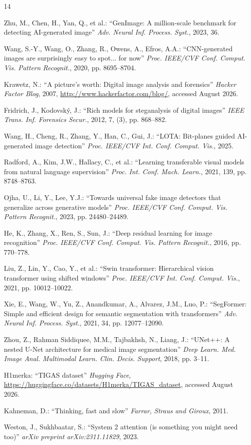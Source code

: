 \documentclass[11pt]{ctexart}
\begin{document}
\begin{thebibliography}{14}

 Zhu, M., Chen, H., Yan, Q., et al.: ``GenImage: A million-scale benchmark for detecting AI-generated image'' \textit{Adv. Neural Inf. Process. Syst.}, 2023, 36.

 Wang, S.-Y., Wang, O., Zhang, R., Owens, A., Efros, A.A.: ``CNN-generated images are surprisingly easy to spot... for now'' \textit{Proc. IEEE/CVF Conf. Comput. Vis. Pattern Recognit.}, 2020, pp. 8695--8704.

 Krawetz, N.: ``A picture's worth: Digital image analysis and forensics'' \textit{Hacker Factor Blog}, 2007, \url{http://www.hackerfactor.com/blog/}, accessed August 2026.

 Fridrich, J., Kodovsk\'{y}, J.: ``Rich models for steganalysis of digital images'' \textit{IEEE Trans. Inf. Forensics Secur.}, 2012, 7, (3), pp. 868--882.

 Wang, H., Cheng, R., Zhang, Y., Han, C., Gui, J.: ``LOTA: Bit-planes guided AI-generated image detection'' \textit{Proc. IEEE/CVF Int. Conf. Comput. Vis.}, 2025.

 Radford, A., Kim, J.W., Hallacy, C., et al.: ``Learning transferable visual models from natural language supervision'' \textit{Proc. Int. Conf. Mach. Learn.}, 2021, 139, pp. 8748--8763.

 Ojha, U., Li, Y., Lee, Y.J.: ``Towards universal fake image detectors that generalize across generative models'' \textit{Proc. IEEE/CVF Conf. Comput. Vis. Pattern Recognit.}, 2023, pp. 24480--24489.

 He, K., Zhang, X., Ren, S., Sun, J.: ``Deep residual learning for image recognition'' \textit{Proc. IEEE/CVF Conf. Comput. Vis. Pattern Recognit.}, 2016, pp. 770--778.

 Liu, Z., Lin, Y., Cao, Y., et al.: ``Swin transformer: Hierarchical vision transformer using shifted windows'' \textit{Proc. IEEE/CVF Int. Conf. Comput. Vis.}, 2021, pp. 10012--10022.

 Xie, E., Wang, W., Yu, Z., Anandkumar, A., Alvarez, J.M., Luo, P.: ``SegFormer: Simple and efficient design for semantic segmentation with transformers'' \textit{Adv. Neural Inf. Process. Syst.}, 2021, 34, pp. 12077--12090.

 Zhou, Z., Rahman Siddiquee, M.M., Tajbakhsh, N., Liang, J.: ``UNet++: A nested U-Net architecture for medical image segmentation'' \textit{Deep Learn. Med. Image Anal. Multimodal Learn. Clin. Decis. Support}, 2018, pp. 3--11.

 H1merka: ``TIGAS dataset'' \textit{Hugging Face}, \url{https://huggingface.co/datasets/H1merka/TIGAS_dataset}, accessed August 2026.

 Kahneman, D.: ``Thinking, fast and slow'' \textit{Farrar, Straus and Giroux}, 2011.

 Weston, J., Sukhbaatar, S.: ``System 2 attention (is something you might need too)'' \textit{arXiv preprint arXiv:2311.11829}, 2023.

\end{thebibliography}
\end{document}
